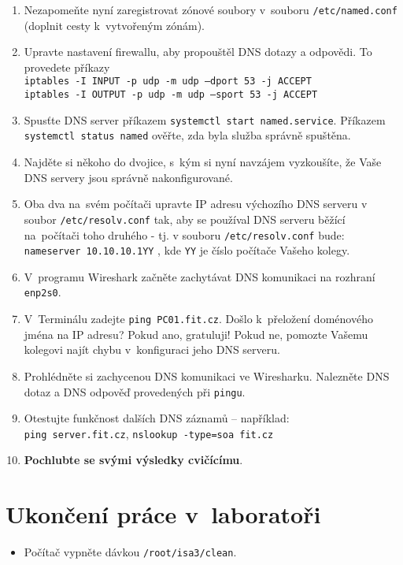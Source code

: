 \begin{enumerate}
  \item Nezapomeňte nyní zaregistrovat zónové soubory v~souboru {\tt /etc/named.conf} (doplnit cesty k~vytvořeným zónám).
  \item Upravte nastavení firewallu, aby propouštěl DNS dotazy a odpovědi. To provedete příkazy \\{\tt iptables -I INPUT -p udp -m udp --dport 53 -j ACCEPT}\\
        {\tt iptables -I OUTPUT -p udp -m udp --sport 53 -j ACCEPT}

  \item Spusťte DNS server příkazem {\tt systemctl start named.service}.
    Příkazem {\tt systemctl status named} ověřte, zda byla služba správně spuštěna.

  \item Najděte si někoho do dvojice, s~kým si nyní navzájem vyzkoušíte, že Vaše DNS servery jsou správně nakonfigurované.
  \item Oba dva na~svém počítači upravte IP adresu výchozího DNS serveru v soubor {\tt /etc/resolv.conf} tak, aby se
    používal DNS serveru běžící na~počítači toho druhého - tj. v souboru {\tt /etc/resolv.conf} bude: \\
    {\tt nameserver 10.10.10.1YY} , kde {\tt YY} je číslo počítače Vašeho kolegy.
  \item V~programu Wireshark začněte zachytávat DNS komunikaci na rozhraní {\tt enp2s0}.
  \item V~Terminálu zadejte {\tt ping PC01.fit.cz}. Došlo k~přeložení doménového jména na IP adresu? Pokud ano, gratuluji! Pokud ne, pomozte Vašemu kolegovi najít chybu
    v~konfiguraci jeho DNS serveru.
  \item Prohlédněte si zachycenou DNS komunikaci ve Wiresharku. Nalezněte DNS dotaz a DNS odpověď provedených při {\tt pingu}.
  \item Otestujte funkčnost dalších DNS záznamů -- například:\\
        {\tt ping server.fit.cz}, {\tt nslookup -type=soa fit.cz}
  \item {\bf Pochlubte se svými výsledky cvičícímu}.
\end{enumerate}




\section{Ukončení práce v~laboratoři}
\begin{itemize}
  \item Počítač vypněte dávkou {\tt /root/isa3/clean}.
\end{itemize}
